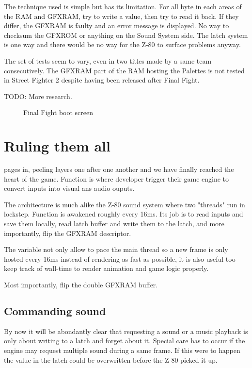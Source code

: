 \pagebreak


The technique used is simple but has its limitation. For all byte in each areas of the RAM and GFXRAM, try to write a value, then try to read it back. If they differ, the GFXRAM is faulty and an error message is displayed. No way to checksum the GFXROM or anything on the Sound System side. The latch system is one way and there would be no way for the Z-80 to surface problems anyway.


The set of tests seem to vary, even in two titles made by a same team consecutively. The GFXRAM part of the RAM hosting the Palettes is not tested in Street Fighter 2 despite having been released after Final Fight.

TODO: More research.

\vfill
\begin{figure}[H]
\caption*{Final Fight boot screen}
\end{figure}


\pagebreak

\section{Ruling them all}
\label{this}
\pageref{this} pages in, peeling layers one after one another and we have finally reached the heart of the game. Function  is where developer trigger their game engine to convert inputs into visual ans audio ouputs.

The architecture is much alike the Z-80 sound system where two "threads" run in lockstep. Function  is awakened roughly every 16ms. Its job is to read inputs and save them locally, read latch buffer and write them to the latch, and more importantly, flip the GFXRAM descriptor. 

\begin{trivia}
The  variable not only allow to pace the main thread so a new frame is only hosted every 16ms instead of rendering as fast as possible, it is also useful too keep track of wall-time to render animation and game logic properly.
\end{trivia}

Most importantly, flip the double GFXRAM buffer.

\subsection{Commanding sound}
By now it will be abondantly clear that requesting a sound or a music playback is only about writing to a latch and forget about it. Special care has to occur if the engine may request multiple sound during a same frame. If this were to happen the value in the latch could be overwritten before the Z-80 picked it up.

